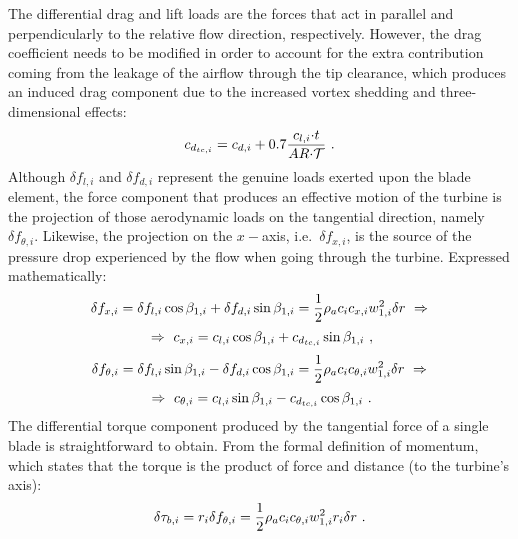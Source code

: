 The differential drag and lift loads are the forces that act in parallel and perpendicularly to the relative flow direction, respectively. However, the drag coefficient needs to be modified in order to account for the extra contribution coming from the leakage of the airflow through the tip clearance, which produces an induced drag component due to the increased vortex shedding and three-dimensional effects:
\begin{equation}{\label{eq:cdtc_definition}}
	c_{d_{tc,i}} = c_{d,i} + 0.7\frac{c_{l,i}{\cdot}t}{AR{\cdot}\mathcal{T}} \ .
\end{equation}
Although $\delta{f_{l,i}}$ and $\delta{f_{d,i}}$ represent the genuine loads exerted upon the blade element, the force component that produces an effective motion of the turbine is the projection of those aerodynamic loads on the tangential direction, namely $\delta{f_{\theta,i}}$. Likewise, the projection on the $x-$axis, i.e.\ $\delta{f_{x,i}}$, is the source of the pressure drop experienced by the flow when going through the turbine. Expressed mathematically:
\begin{equation}{\label{eq:fx_definition}}
	\delta{f_{x,i}} = \delta{f_{l,i}}\cos{\beta_{1,i}} + \delta{f_{d,i}}\sin{\beta_{1,i}}=\frac{1}{2}\rho_{a}c_{i}c_{x,i}w_{1,i}^{2}\delta{r} \ \Rightarrow
\end{equation}
\begin{equation}{\label{eq:cx_definition}}
	\Rightarrow \ c_{x,i} = c_{l,i}\cos{\beta_{1,i}} + c_{d_{tc,i}}\sin{\beta_{1,i}} \ ,
\end{equation}
\begin{equation}{\label{eq:ftheta_definition}}
	\delta{f_{\theta,i}} = \delta{f_{l,i}}\sin{\beta_{1,i}} - \delta{f_{d,i}}\cos{\beta_{1,i}}=\frac{1}{2}\rho_{a}c_{i}c_{\theta,i}w_{1,i}^{2}\delta{r} \ \Rightarrow
\end{equation}
\begin{equation}{\label{eq:ctheta_definition}}
	\Rightarrow \ c_{\theta,i} = c_{l,i}\sin{\beta_{1,i}} - c_{d_{tc,i}}\cos{\beta_{1,i}} \ .
\end{equation}
The differential torque component produced by the tangential force of a single blade is straightforward to obtain. From the formal definition of momentum, which states that the torque is the product of force and distance (to the turbine's axis):
\begin{equation}{\label{eq:differential_torque_single_blade}}
	\delta{\tau_{b,i}}=r_{i}\delta{f_{\theta,i}}=\frac{1}{2}\rho_{a}c_{i}c_{\theta,i}w_{1,i}^{2}r_{i}\delta{r} \ .
\end{equation}
